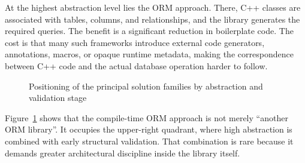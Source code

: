 At the highest abstraction level lies the ORM approach. There, C++ classes are associated with tables, columns, and relationships, and the library generates the required queries. The benefit is a significant reduction in boilerplate code. The cost is that many such frameworks introduce external code generators, annotations, macros, or opaque runtime metadata, making the correspondence between C++ code and the actual database operation harder to follow.

\begin{figure}[H]
\centering
{}
\caption{Positioning of the principal solution families by abstraction and validation stage}
\label{fig:existing_solutions_map}
\end{figure}

Figure~\ref{fig:existing_solutions_map} shows that the compile-time ORM approach is not merely ``another ORM library''. It occupies the upper-right quadrant, where high abstraction is combined with early structural validation. That combination is rare because it demands greater architectural discipline inside the library itself.

